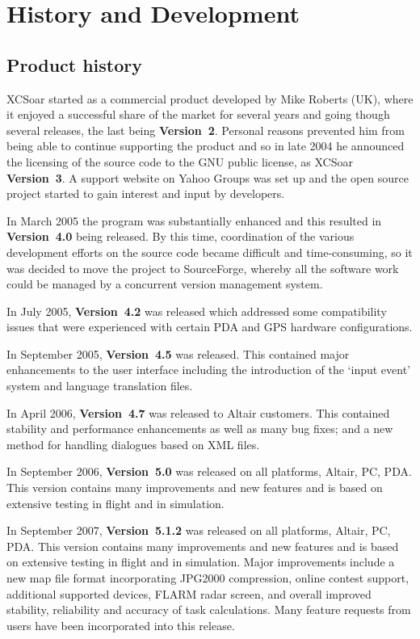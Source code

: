 \chapter{History and Development}\label{cha:history-development}


\section{Product history}

XCSoar started as a commercial product developed by Mike Roberts (UK),
where it enjoyed a successful share of the market for several years
and going though several releases, the last being {\bf Version~2}.
Personal reasons prevented him from being able to continue supporting
the product and so in late 2004 he announced the licensing of the
source code to the GNU public license, as XCSoar {\bf Version~3}.  A support
website on Yahoo Groups was set up and the open source project started
to gain interest and input by developers.

In March 2005 the program was substantially enhanced and this resulted 
in {\bf Version~4.0} being released.  By this time, coordination of
the various development efforts on the source code became difficult
and time-consuming, so it was decided to move the project to
SourceForge, whereby all the software work could be managed by a
concurrent version management system.

In July 2005, {\bf Version~4.2} was released which addressed some
compatibility issues that were experienced with certain PDA and GPS
hardware configurations.

In September 2005, {\bf Version~4.5} was released.  This contained
major enhancements to the user interface including the introduction
of the `input event' system and language translation files.

In April 2006, {\bf Version~4.7} was released to Altair customers.
This contained stability and performance enhancements as well as many
bug fixes; and a new method for handling dialogues based on XML files.

In September 2006, {\bf Version~5.0} was released on all platforms,
Altair, PC, PDA.  This version contains many improvements and new
features and is based on extensive testing in flight and in
simulation.

In September 2007, {\bf Version~5.1.2} was released on all platforms,
Altair, PC, PDA.  This version contains many improvements and new
features and is based on extensive testing in flight and in
simulation.  Major improvements include a new map file format
incorporating JPG2000 compression, online contest support, additional
supported devices, FLARM radar screen, and overall improved stability,
reliability and accuracy of task calculations.  Many feature requests
from users have been incorporated into this release.

